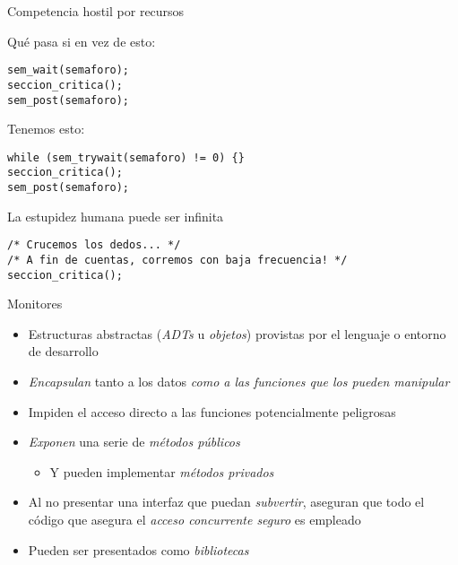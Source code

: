 \documentclass[presentation]{beamer}
\begin{document}
\begin{frame}[label={sec:org62c9886},fragile]{Competencia hostil por recursos}
 \begin{center}
Qué pasa si en vez de esto:
\end{center}
\begin{verbatim}
sem_wait(semaforo);
seccion_critica();
sem_post(semaforo);
\end{verbatim}
\begin{center}
Tenemos esto:
\end{center}
\begin{verbatim}
while (sem_trywait(semaforo) != 0) {}
seccion_critica();
sem_post(semaforo);
\end{verbatim}
\end{frame}

\begin{frame}[label={sec:org70d7976},fragile]{La estupidez humana puede ser infinita}
 \begin{verbatim}
/* Crucemos los dedos... */
/* A fin de cuentas, corremos con baja frecuencia! */
seccion_critica();
\end{verbatim}
\end{frame}

\begin{frame}[label={sec:orgda63760}]{Monitores}
\begin{itemize}
\item Estructuras abstractas (\emph{ADTs} u \emph{objetos}) provistas por el lenguaje
o entorno de desarrollo
\item \emph{Encapsulan} tanto a los datos \emph{como a las funciones que los pueden
manipular}
\item Impiden el acceso directo a las funciones potencialmente peligrosas
\item \emph{Exponen} una serie de \emph{métodos públicos}
\begin{itemize}
\item Y pueden implementar \emph{métodos privados}
\end{itemize}
\item Al no presentar una interfaz que puedan \emph{subvertir}, aseguran que
todo el código que asegura el \emph{acceso concurrente seguro} es empleado
\item Pueden ser presentados como \emph{bibliotecas}
\end{itemize}
\end{frame}
\end{document}
